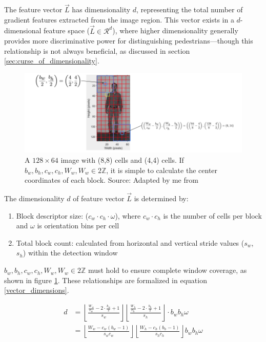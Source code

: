The feature vector $\vec{L}$ has dimensionality $d$, representing the total number of gradient features extracted from the image region. This vector exists in a $d$-dimensional feature space ($\vec{L} \in \mathcal{R}^{d}$), where higher dimensionality generally provides more discriminative power for distinguishing pedestrians—though this relationship is not always beneficial, as discussed in section \ref{sec:curse_of_dimensionality}.

\begin{figure}
    \centering
    \includegraphics[width=1\linewidth]{images/Center Coordinates.png}
    \caption{A $128\times64$ image with (8,8) cells and (4,4) cells. If $b_w,b_h,c_w,c_h,W_w,W_w\in2\mathbb{Z}$, it is simple to calculate the center coordinates of each block. Source: Adapted by me from \cite{shidlovskiy_2020_reducing}}
    \label{fig:center_coords}
\end{figure}

The dimensionality $d$ of feature vector $\vec{L}$ is determined by:
\begin{enumerate}
    \item Block descriptor size: ($c_w \cdot c_h \cdot \omega$), where $c_w \cdot c_h$ is the number of cells per block and $\omega$ is orientation bins per cell
    \item Total block count: calculated from horizontal and vertical stride values ($s_w$, $s_h$) within the detection window
\end{enumerate}

$b_w,b_h,c_w,c_h,W_w,W_w\in2\mathbb{Z}$ must hold to ensure complete window coverage, as shown in figure \ref{fig:center_coords}. These relationships are formalized in equation \ref{vector_dimensions}.

\begin{equation}
    \label{vector_dimensions}
    \begin{split}
    d &= \left\lfloor \frac{\frac{W_w}{c_w}-2\cdot\frac{b_w}{2}+1}{s_w} \right\rfloor\left\lfloor \frac{\frac{W_h}{c_h}-2\cdot\frac{b_h}{2}+1}{s_h} \right\rfloor\cdot b_w b_h\omega \\ &= \left\lfloor  \frac{W_w- c_w(b_w-1)}{s_w c_w}  \right\rfloor \left\lfloor   \frac{W_h -c_h(b_h -1)}{s_h c_h} \right\rfloor b_w b_h\omega
    \end{split}
\end{equation}

